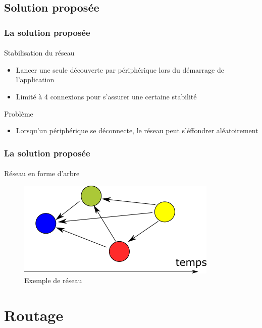 \documentclass{beamer}
\begin{document}
    \subsection{Solution proposée}
    \begin{frame}
      \frametitle{La solution proposée}
      \framesubtitle{}
      \begin{block}{Stabilisation du réseau}
        \begin{itemize}
          \item Lancer une seule découverte par périphérique lors du démarrage de l'application
          \item Limité à 4 connexions pour s'assurer une certaine stabilité
        \end{itemize}
      \end{block}
      \begin{block}{Problème}
        \begin{itemize}
          \item Lorsqu'un périphérique se déconnecte, le réseau peut s'éffondrer aléatoirement
        \end{itemize}
      \end{block}
    \end{frame}
    \begin{frame}
      \frametitle{La solution proposée}
      \framesubtitle{}
      \begin{block}{Réseau en forme d'arbre}
        \begin{figure}
          \begin{center}
            \includegraphics[width=.5\textwidth]{images/auto.png}
            \caption{Exemple de réseau}
            \label{fig:auto}
          \end{center}
        \end{figure}
      \end{block}
    \end{frame}

  \section{Routage}
\end{document}
